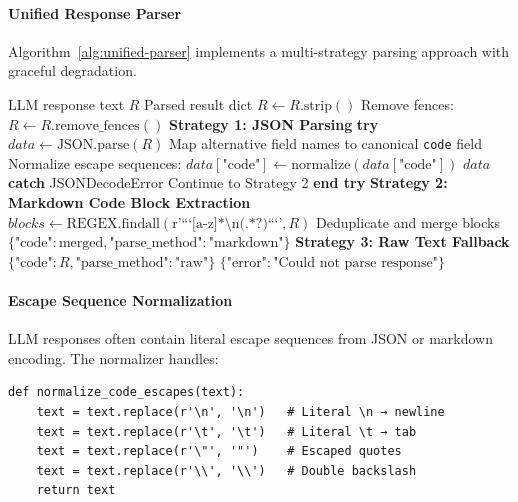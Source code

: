 \paragraph{Unified Response Parser}
Algorithm~\ref{alg:unified-parser} implements a multi-strategy parsing approach with graceful degradation.

\begin{algorithm}
\caption{Unified Response Parser}
\label{alg:unified-parser}
\begin{algorithmic}[1]
\REQUIRE LLM response text \(R\)
\ENSURE Parsed result dict
\STATE \(R \gets R.\text{strip}()\)
    \STATE Remove fences: \(R \gets R.\text{remove\_fences}()\)
\ENDIF
\STATE \textbf{Strategy 1: JSON Parsing}
\STATE \textbf{try}
    \STATE \(data \gets \text{JSON.parse}(R)\)
    \STATE Map alternative field names to canonical \texttt{code} field
    \STATE Normalize escape sequences: \(data[\text{"code"}] \gets \text{normalize}(data[\text{"code"}])\)
    \RETURN \(data\)
\STATE \textbf{catch} JSONDecodeError
    \STATE Continue to Strategy 2
\STATE \textbf{end try}
\STATE \textbf{Strategy 2: Markdown Code Block Extraction}
\STATE \(blocks \gets \text{REGEX.findall}(\text{r'```[a-z]*\textbackslash n(.*?)```'}, R)\)
    \STATE Deduplicate and merge blocks
    \RETURN \(\{\text{"code"}: \text{merged}, \text{"parse\_method"}: \text{"markdown"}\}\)
\ENDIF
\STATE \textbf{Strategy 3: Raw Text Fallback}
    \RETURN \(\{\text{"code"}: R, \text{"parse\_method"}: \text{"raw"}\}\)
\ENDIF
\RETURN \(\{\text{"error"}: \text{"Could not parse response"}\}\)
\end{algorithmic}
\end{algorithm}

\paragraph{Escape Sequence Normalization}
LLM responses often contain literal escape sequences from JSON or markdown encoding. The normalizer handles:

\begin{verbatim}
def normalize_code_escapes(text):
    text = text.replace(r'\n', '\n')   # Literal \n → newline
    text = text.replace(r'\t', '\t')   # Literal \t → tab
    text = text.replace(r'\"', '"')    # Escaped quotes
    text = text.replace(r'\\', '\\')   # Double backslash
    return text
\end{verbatim}

